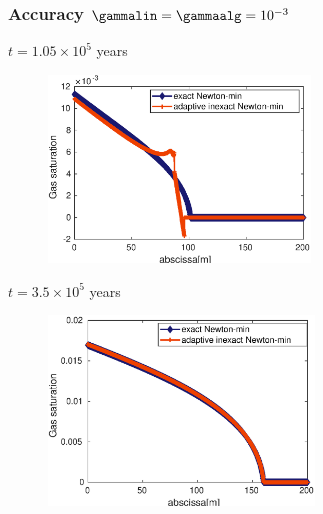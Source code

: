 \documentclass[10 pt]{beamer}
\begin{document}
\begin{frame}
\frametitle{Accuracy  $\gammalin = \gammaalg = 10^{-3}$}
\vspace{-0.1 cm}
\begin{minipage}[c]{.27\linewidth}
\textcolor{cadmiumgreen}{$t = 1.05 \times 10^5$ years}
\end{minipage} 
\hfill
\begin{minipage}[c]{.72\linewidth}
\begin{figure}
\centering
\includegraphics[width=0.62\textwidth]{image/comparaison_plot_gas_saturations_exact_adapt_inexact_gamma_lin_gamma_alg_10-3_nt_21}

\end{figure}
\end{minipage}
\begin{minipage}[c]{.27\linewidth}
\textcolor{cadmiumgreen}{$t = 3.5 \times 10^5$ years}
\end{minipage}
\hfill
\begin{minipage}[c]{.72\linewidth}
\begin{figure}
\includegraphics[width=0.63\textwidth]{image/comparaison_plot_gas_saturations_exact_adapt_inexact_gamma_lin_gamma_alg_10-3_nt_70}
\end{figure}
\end{minipage} 
\end{frame}
%
\end{document}

